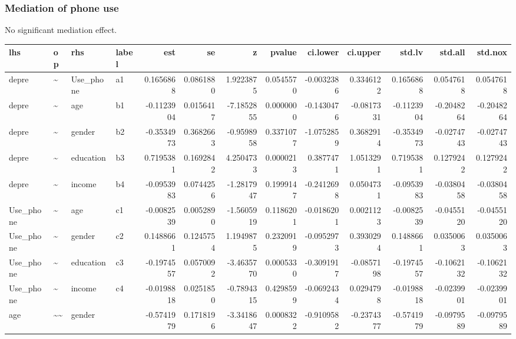 \documentclass[
]{article}
\begin{document}
\hypertarget{mediation-of-phone-use}{%
\subsubsection{Mediation of phone use}\label{mediation-of-phone-use}}

No significant mediation effect.

\begin{table}[!h]
\centering
\begin{tabular}[t]{llllrrrrrrrrr}
\toprule
lhs & op & rhs & label & est & se & z & pvalue & ci.lower & ci.upper & std.lv & std.all & std.nox\\
\midrule
depre & \textasciitilde{} & Use\_phone & a1 & 0.1656868 & 0.0861880 & 1.9223875 & 0.0545570 & -0.0032386 & 0.3346122 & 0.1656868 & 0.0547618 & 0.0547618\\
depre & \textasciitilde{} & age & b1 & -0.1123904 & 0.0156417 & -7.1852855 & 0.0000000 & -0.1430476 & -0.0817331 & -0.1123904 & -0.2048264 & -0.2048264\\
depre & \textasciitilde{} & gender & b2 & -0.3534973 & 0.3682663 & -0.9598958 & 0.3371077 & -1.0752859 & 0.3682914 & -0.3534973 & -0.0274743 & -0.0274743\\
depre & \textasciitilde{} & education & b3 & 0.7195381 & 0.1692842 & 4.2504733 & 0.0000213 & 0.3877471 & 1.0513291 & 0.7195381 & 0.1279242 & 0.1279242\\
depre & \textasciitilde{} & income & b4 & -0.0953983 & 0.0744256 & -1.2817947 & 0.1999147 & -0.2412698 & 0.0504731 & -0.0953983 & -0.0380458 & -0.0380458\\
\addlinespace
Use\_phone & \textasciitilde{} & age & c1 & -0.0082539 & 0.0052890 & -1.5605919 & 0.1186201 & -0.0186201 & 0.0021123 & -0.0082539 & -0.0455120 & -0.0455120\\
Use\_phone & \textasciitilde{} & gender & c2 & 0.1488661 & 0.1245754 & 1.1949875 & 0.2320919 & -0.0952973 & 0.3930294 & 0.1488661 & 0.0350063 & 0.0350063\\
Use\_phone & \textasciitilde{} & education & c3 & -0.1974557 & 0.0570092 & -3.4635770 & 0.0005330 & -0.3091917 & -0.0857198 & -0.1974557 & -0.1062132 & -0.1062132\\
Use\_phone & \textasciitilde{} & income & c4 & -0.0198818 & 0.0251850 & -0.7894315 & 0.4298599 & -0.0692434 & 0.0294798 & -0.0198818 & -0.0239901 & -0.0239901\\
age & \textasciitilde{}\textasciitilde{} & gender &  & -0.5741979 & 0.1718196 & -3.3418647 & 0.0008322 & -0.9109582 & -0.2374377 & -0.5741979 & -0.0979589 & -0.0979589\\

\end{tabular}
\end{table}
\end{document}
